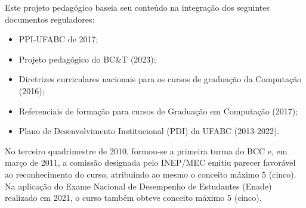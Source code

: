 Este projeto pedagógico baseia seu conteúdo na integração dos seguintes
documentos reguladores:
\begin{itemize}
    \item PPI-UFABC de 2017;
    \item Projeto pedagógico do BC\&T (2023);
    \item Diretrizes curriculares nacionais para os cursos de graduação da Computação (2016);
    \item Referenciais de formação para cursos de Graduação em Computação (2017);
    \item Plano de Desenvolvimento Institucional (PDI) da UFABC (2013-2022).
\end{itemize}

No terceiro quadrimestre de 2010, formou-se a primeira turma do BCC e, em março
de 2011, a comissão designada pelo INEP/MEC emitiu parecer favorável ao
reconhecimento do curso, atribuindo ao mesmo o conceito máximo 5 (cinco).
Na aplicação do Exame Nacional de Desempenho de Estudantes (Enade) realizado em
2021, o curso também obteve conceito máximo 5 (cinco).
